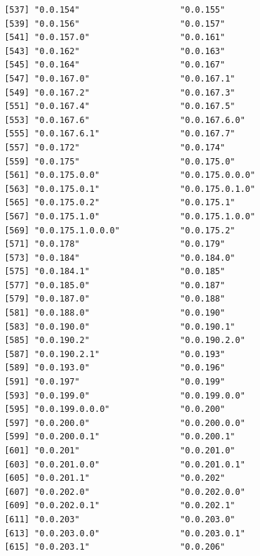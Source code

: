 \documentclass[
  letterpaper,
  DIV=11,
  numbers=noendperiod]{scrreprt}
\begin{document}
\begin{verbatim}
 [537] "0.0.154"                    "0.0.155"                   
 [539] "0.0.156"                    "0.0.157"                   
 [541] "0.0.157.0"                  "0.0.161"                   
 [543] "0.0.162"                    "0.0.163"                   
 [545] "0.0.164"                    "0.0.167"                   
 [547] "0.0.167.0"                  "0.0.167.1"                 
 [549] "0.0.167.2"                  "0.0.167.3"                 
 [551] "0.0.167.4"                  "0.0.167.5"                 
 [553] "0.0.167.6"                  "0.0.167.6.0"               
 [555] "0.0.167.6.1"                "0.0.167.7"                 
 [557] "0.0.172"                    "0.0.174"                   
 [559] "0.0.175"                    "0.0.175.0"                 
 [561] "0.0.175.0.0"                "0.0.175.0.0.0"             
 [563] "0.0.175.0.1"                "0.0.175.0.1.0"             
 [565] "0.0.175.0.2"                "0.0.175.1"                 
 [567] "0.0.175.1.0"                "0.0.175.1.0.0"             
 [569] "0.0.175.1.0.0.0"            "0.0.175.2"                 
 [571] "0.0.178"                    "0.0.179"                   
 [573] "0.0.184"                    "0.0.184.0"                 
 [575] "0.0.184.1"                  "0.0.185"                   
 [577] "0.0.185.0"                  "0.0.187"                   
 [579] "0.0.187.0"                  "0.0.188"                   
 [581] "0.0.188.0"                  "0.0.190"                   
 [583] "0.0.190.0"                  "0.0.190.1"                 
 [585] "0.0.190.2"                  "0.0.190.2.0"               
 [587] "0.0.190.2.1"                "0.0.193"                   
 [589] "0.0.193.0"                  "0.0.196"                   
 [591] "0.0.197"                    "0.0.199"                   
 [593] "0.0.199.0"                  "0.0.199.0.0"               
 [595] "0.0.199.0.0.0"              "0.0.200"                   
 [597] "0.0.200.0"                  "0.0.200.0.0"               
 [599] "0.0.200.0.1"                "0.0.200.1"                 
 [601] "0.0.201"                    "0.0.201.0"                 
 [603] "0.0.201.0.0"                "0.0.201.0.1"               
 [605] "0.0.201.1"                  "0.0.202"                   
 [607] "0.0.202.0"                  "0.0.202.0.0"               
 [609] "0.0.202.0.1"                "0.0.202.1"                 
 [611] "0.0.203"                    "0.0.203.0"                 
 [613] "0.0.203.0.0"                "0.0.203.0.1"               
 [615] "0.0.203.1"                  "0.0.206"                   

\end{verbatim}
\end{document}
